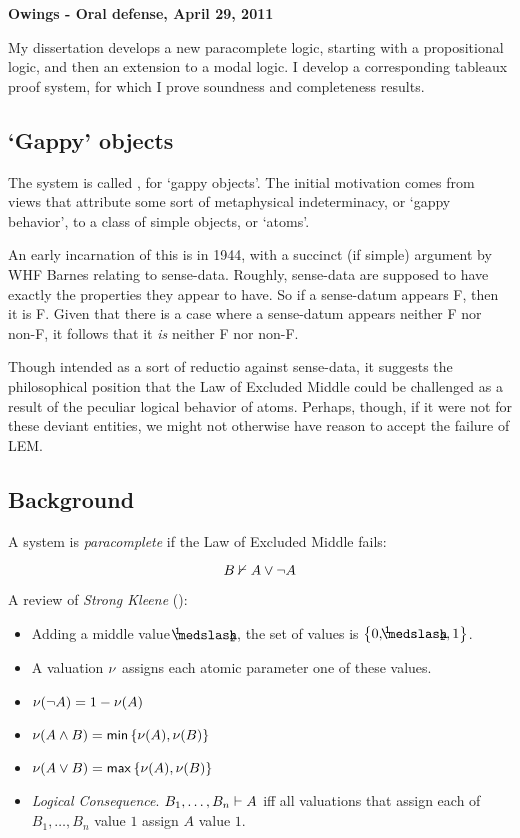 \documentclass[11pt]{article}
\begin{document}
\noindent\textbf{Owings - Oral defense, April 29, 2011}

\bigskip

\bigskip

My dissertation develops a new paracomplete logic, starting with a propositional logic, and then an extension to a modal logic. I develop a corresponding tableaux proof system, for which I prove soundness and completeness results. 

\subsection*{`Gappy' objects}
The system is called \GO, for `gappy objects'. The initial motivation comes from views that attribute some sort of metaphysical indeterminacy, or `gappy behavior', to a class of simple objects, or `atoms'. 

An early incarnation of this is in 1944, with a succinct (if simple) argument by WHF Barnes relating to sense-data. Roughly, sense-data are supposed to have exactly the properties they appear to have. So if a sense-datum appears F, then it is F. Given that there is a case where a sense-datum appears neither F nor non-F, it follows that it \emph{is} neither F nor non-F.

Though intended as a sort of reductio against sense-data, it suggests the philosophical position that the Law of Excluded Middle could be challenged as a result of the peculiar logical behavior of atoms. Perhaps, though, if it were not for these deviant entities, we might not otherwise have reason to accept the failure of LEM.

\subsection*{Background}
A system is \emph{paracomplete} if the Law of Excluded Middle fails:

\[{B}\nvdash{A\vee\neg A}\]

\noindent A review of \emph{Strong Kleene} (\Kthree):

\begin{itemize}
	\item Adding a middle value $\oneHalf$, the set of values is $\set{0,\oneHalf,1}$.
	\item A valuation $\mathcal{\nu}$ assigns each atomic parameter one of these values.
	\item $\mathcal{\nu}({\neg A}) = 1 - \mathcal{\nu}({A})$
	\item $\mathcal{\nu}({A\wedge B}) = \mathsf{min}\left\{{\mathcal{\nu}({A}),\mathcal{\nu}({B})}\right\}$
	\item $\mathcal{\nu}({A\vee B}) = \mathsf{max}\left\{{\mathcal{\nu}({A}),\mathcal{\nu}({B})}\right\}$
	\item \emph{Logical Consequence}. ${B_1,\dots,B_n}\vdash{A}$ iff all valuations that assign each of $B_1,\dots,B_n$ value $1$ assign $A$ value $1$.
\end{itemize}
\pagebreak
\end{document}
